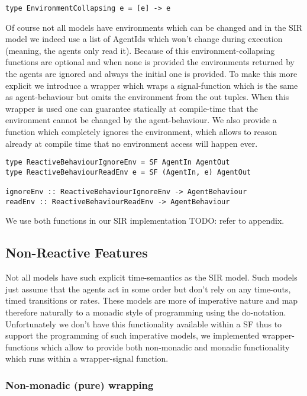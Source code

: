 \begin{verbatim}
type EnvironmentCollapsing e = [e] -> e
\end{verbatim}

Of course not all models have environments which can be changed and in the SIR model we indeed use a list of AgentIds which won't change during execution (meaning, the agents only read it). Because of this environment-collapsing functions are optional and when none is provided the environments returned by the agents are ignored and always the initial one is provided.
To make this more explicit we introduce a wrapper which wraps a signal-function which is the same as agent-behaviour but omits the environment from the out tuples. When this wrapper is used one can guarantee statically at compile-time that the environment cannot be changed by the agent-behaviour. We also provide a function which completely ignores the environment, which allows to reason already at compile time that no environment access will happen ever.

\begin{verbatim}
type ReactiveBehaviourIgnoreEnv = SF AgentIn AgentOut
type ReactiveBehaviourReadEnv e = SF (AgentIn, e) AgentOut

ignoreEnv :: ReactiveBehaviourIgnoreEnv -> AgentBehaviour
readEnv :: ReactiveBehaviourReadEnv -> AgentBehaviour
\end{verbatim}

We use both functions in our SIR implementation TODO: refer to appendix.

\subsection{Non-Reactive Features}
Not all models have such explicit time-semantics as the SIR model. Such models just assume that the agents act in some order but don't rely on any time-outs, timed transitions or rates. These models are more of imperative nature and map therefore naturally to a monadic style of programming using the do-notation. Unfortunately we don't have this functionality available within a SF thus to support the programming of such imperative models, we implemented wrapper-functions which allow to provide both non-monadic and monadic functionality which runs within a wrapper-signal function.

\subsubsection{Non-monadic (pure) wrapping}

